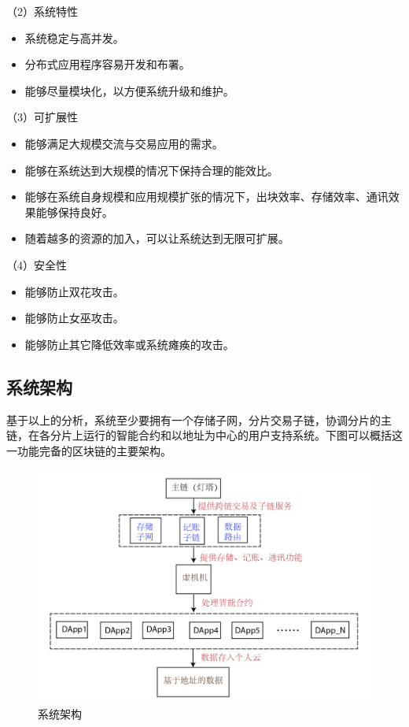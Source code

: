 \documentclass[a4paper,12pt]{article}
\begin{document}
（2）系统特性
\begin{itemize}[itemindent=1em]
	\item 系统稳定与高并发。
        \item 分布式应用程序容易开发和布署。
	\item 能够尽量模块化，以方便系统升级和维护。
\end{itemize}

（3）可扩展性
\begin{itemize}[itemindent=1em]
	\item 能够满足大规模交流与交易应用的需求。
	\item 能够在系统达到大规模的情况下保持合理的能效比。
	\item 能够在系统自身规模和应用规模扩张的情况下，出块效率、存储效率、通讯效果能够保持良好。
        \item 随着越多的资源的加入，可以让系统达到无限可扩展。
\end{itemize}


（4）安全性
\begin{itemize}[itemindent=1em]
	\item 能够防止双花攻击。
	\item 能够防止女巫攻击。
        \item 能够防止其它降低效率或系统瘫痪的攻击。
\end{itemize}


\subsection{系统架构}

基于以上的分析，系统至少要拥有一个存储子网，分片交易子链，协调分片的主链，在各分片上运行的智能合约和以地址为中心的用户支持系统。下图可以概括这一功能完备的区块链的主要架构。

\begin {figure} [htbp]
\centering \includegraphics [width = 5in] {pic_cn/framework_cnt.png}
\caption {系统架构} \label {fig: structure}
\end {figure}
\end{document}
